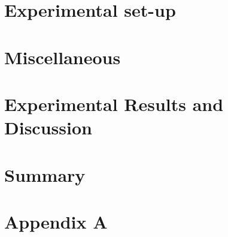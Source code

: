 \documentclass[a4paper,10pt,twoside]{report}
\begin{document}
\chapter{Experimental set-up}\label{chapter:Experimental set-up and Results}


\chapter{Miscellaneous}\label{chapter:Miscellaneous}

 
\chapter{Experimental Results and Discussion}\label{chapter:Results and discussion}



\chapter{Summary}\label{chapter:Summary}




\newpage

\appendix
{}
\chapter{Appendix A}\label{chapter:Appendix A}

\end{document}
